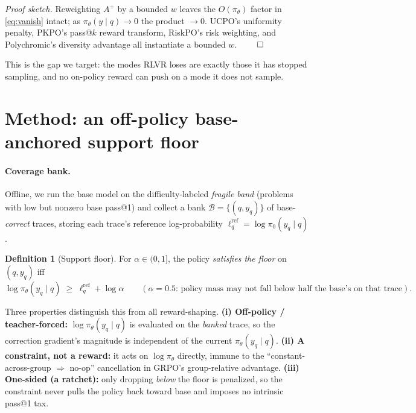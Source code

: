 \documentclass[11pt]{article}
\theoremstyle{definition}
\newtheorem{definition}{Definition}
\begin{document}
\noindent\emph{Proof sketch.} Reweighting $A^{+}$ by a bounded $w$ leaves the $O(\pi_\theta)$ factor
in \eqref{eq:vanish} intact; as $\pi_\theta(y\mid q)\to0$ the product $\to0$. UCPO's uniformity
penalty, PKPO's pass@$k$ reward transform, RiskPO's risk weighting, and Polychromic's diversity
advantage all instantiate a bounded $w$. $\qed$

\medskip
\noindent This is the gap we target: the modes RLVR loses are exactly those it has stopped sampling,
and no on-policy reward can push on a mode it does not sample.

\section{Method: an off-policy base-anchored support floor}
\label{sec:method}
\paragraph{Coverage bank.} Offline, we run the base model on the difficulty-labeled \emph{fragile
band} (problems with low but nonzero base pass@1) and collect a bank
$\mathcal{B}=\{(q,y_q)\}$ of base-\emph{correct} traces, storing each trace's reference log-probability
$\ell^{\mathrm{ref}}_q=\log\pi_0(y_q\mid q)$.

\begin{definition}[Support floor]
For $\alpha\in(0,1]$, the policy \emph{satisfies the floor} on $(q,y_q)$ iff
\begin{equation}
\log\pi_\theta(y_q\mid q)\;\ge\;\ell^{\mathrm{ref}}_q+\log\alpha
\qquad(\text{$\alpha{=}0.5$: policy mass may not fall below half the base's on that trace}).
\label{eq:floor}
\end{equation}
\end{definition}

Three properties distinguish this from all reward-shaping. \textbf{(i) Off-policy / teacher-forced:}
$\log\pi_\theta(y_q\mid q)$ is evaluated on the \emph{banked} trace, so the correction gradient's
magnitude is independent of the current $\pi_\theta(y_q\mid q)$. \textbf{(ii) A constraint, not a
reward:} it acts on $\log\pi_\theta$ directly, immune to the ``constant-across-group $\Rightarrow$
no-op'' cancellation in GRPO's group-relative advantage. \textbf{(iii) One-sided (a ratchet):} only
dropping \emph{below} the floor is penalized, so the constraint never pulls the policy back toward
base and imposes no intrinsic pass@1 tax.
\end{document}
